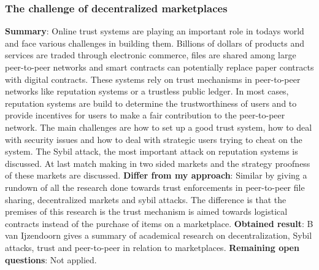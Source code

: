 \subsubsection{The challenge of decentralized marketplaces \cite{challangeDecentralizedMarketplaces}}
\textbf{Summary}: Online trust systems are playing an important role in todays world and face various challenges in building them. Billions of dollars of products and services are traded through electronic commerce, files are shared among large peer-to-peer networks and smart contracts can potentially replace paper contracts with digital contracts. These systems rely on trust mechanisms in peer-to-peer networks like reputation systems or a trustless public ledger. In most cases, reputation systems are build to determine the trustworthiness of users and to provide incentives for users to make a fair contribution to the peer-to-peer network. The main challenges are how to set up a good trust system, how to deal with security issues and how to deal with strategic users trying to cheat on the system. The Sybil attack, the most important attack on reputation systems is discussed. At last match making in two sided markets and the strategy proofness of these markets are discussed.\newline
\textbf{Differ from my approach}: Similar by giving a rundown of all the research done towards trust enforcements in peer-to-peer file sharing, decentralized markets and sybil attacks. The difference is that the premises of this research is the trust mechanism is aimed towards logistical contracts instead of the purchase of items on a marketplace.\newline
\textbf{Obtained result}: B van Ijzendoorn gives a summary of academical research on decentralization, Sybil attacks, trust and peer-to-peer in relation to marketplaces. \newline
\textbf{Remaining open questions}: Not applied.\newline

